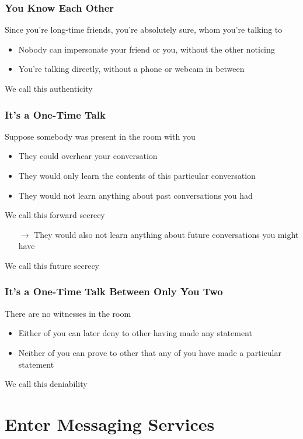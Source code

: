 \documentclass[aspectratio=169]{beamer}
\begin{document}
\begin{frame}
	\frametitle{You Know Each Other}
	Since you're long-time friends, you're absolutely sure, whom you're talking to
	\begin{itemize}
		\item Nobody can impersonate your friend or you, without the other noticing
		\item You're talking directly, without a phone or webcam in between
	\end{itemize}
	We call this \alert{authenticity}
\end{frame}

\begin{frame}
	\frametitle{It's a One-Time Talk}
	Suppose somebody was present in the room with you	
	\begin{itemize}
		\item They could overhear your conversation
		\item They would only learn the contents of this particular conversation
		\item They would not learn anything about past conversations you had
	\end{itemize}
	We call this \alert{forward secrecy}
	\begin{itemize}
		\item[$\rightarrow$] They would also not learn anything about future conversations you might have
	\end{itemize}
	We call this \alert{future secrecy}
\end{frame}

\begin{frame}
	\frametitle{It's a One-Time Talk Between Only You Two}
	There are no witnesses in the room
	\begin{itemize}
		\item Either of you can later deny to other having made any statement
		\item Neither of you can prove to other that any of you have made a particular statement
	\end{itemize}
	We call this \alert{deniability}
\end{frame}

\section{Enter Messaging Services}
\end{document}
